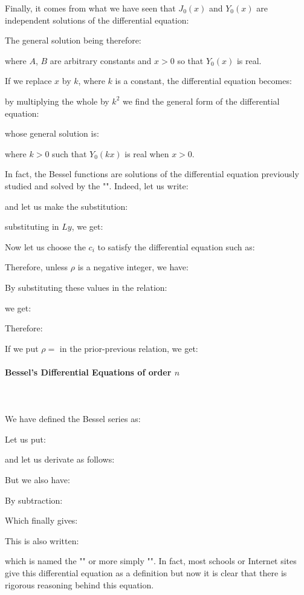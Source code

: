 	Finally, it comes from what we have seen that $J_0(x)$ and $Y_0(x)$ are independent solutions of the differential equation:
	
	The general solution being therefore:
	
	where $A$, $B$ are arbitrary constants and $x>0$ so that $Y_0(x)$ is real.

	If we replace $x$ by $k$, where $k$ is a constant, the differential equation becomes:
	
	by multiplying the whole by $k^2$ we find the general form of the differential equation:
	
	whose general solution is:
	
	where $k>0$ such that $Y_0(kx)$ is real when $x>0$.
	
	In fact, the Bessel functions are solutions of the differential equation previously studied and solved by the "". Indeed, let us write:
	
	and let us make the substitution:
	
	substituting in $Ly$, we get:
	
	Now let us choose the $c_i$ to satisfy the differential equation such as:
	
	Therefore, unless $\rho$ is a negative integer, we have:
	
	By substituting these values in the relation:
	
	we get:
	
	Therefore:
	
	If we put $\rho=$ in the prior-previous relation, we get:
	
	
	\paragraph{Bessel's Differential Equations of order $n$}\mbox{}\\\\
	We have defined the Bessel series as:
	
	Let us put:
	
	and let us derivate as follows:
	
	But we also have:
	
	By subtraction:
	
	Which finally gives:
	
	This is also written:
	
	which is named the "" or more simply "". In fact, most schools or Internet sites give this differential equation as a definition but now it is clear that there is rigorous reasoning behind this equation.
	
